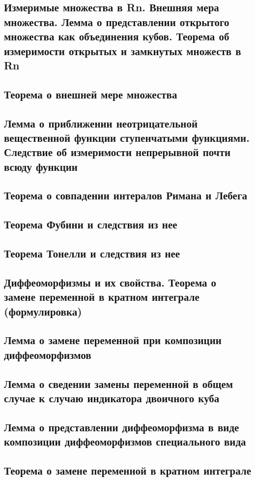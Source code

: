 \documentclass[a4paper]{article}
\theoremstyle{definition}
\theoremstyle{remark}
\begin{document}
    \subsection{ Измеримые множества в Rn. Внешняя мера множества. Лемма о представлении открытого множества как объединения кубов. Теорема об измеримости открытых и замкнутых множеств в Rn}
    \subsection{ Теорема о внешней мере множества}
    \subsection{ Лемма о приближении неотрицательной вещественной функции ступенчатыми функциями. Следствие об измеримости непрерывной почти всюду функции}
    \subsection{ Теорема о совпадении интералов Римана и Лебега}
    \subsection{ Теорема Фубини и следствия из нее}
    \subsection{ Теорема Тонелли и следствия из нее}
    \subsection{ Диффеоморфизмы и их свойства. Теорема о замене переменной в кратном интеграле (формулировка)}
    \subsection{ Лемма о замене переменной при композиции диффеоморфизмов}
    \subsection{ Лемма о сведении замены переменной в общем случае к случаю индикатора двоичного куба}
    \subsection{ Лемма о представлении диффеоморфизма в виде композиции диффеоморфизмов специального вида}
    \subsection{ Теорема о замене переменной в кратном интеграле}
    
\end{document}
